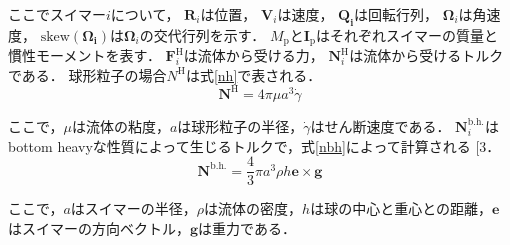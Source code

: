 \documentclass[twocolumns,10pt,a4j]{jarticle}
\makeatletter
\DeclareRobustCommand\cite{\unskip
  \@ifnextchar[{\@tempswatrue\@citex}{\@tempswafalse\@citex[]}}
\makeatother
\begin{document}
  \noindent
ここでスイマー$i$について，
$\boldsymbol{R}_i$は位置，
$\boldsymbol{V}_i$は速度，
$\boldsymbol{Q_i}$は回転行列，
$\boldsymbol{\Omega}_i$は角速度，
$\mathrm{skew} (\boldsymbol{\Omega_i})$は$\boldsymbol{\Omega}_i$の交代行列を示す．
$M_\mathrm{p}$と$\boldsymbol{I}_\mathrm{p}$はそれぞれスイマーの質量と慣性モーメントを表す．
$\boldsymbol{F}_i^\mathrm{H}$は流体から受ける力，
$\boldsymbol{N}_i^\mathrm{H}$は流体から受けるトルクである．
球形粒子の場合$N^\mathrm{H}$は式\eqref{nh}で表される．
  \vspace{-3truemm}
  \begin{equation}
    \boldsymbol{N^\mathrm{H}} = 4 \pi \mu a^3 \dot{\gamma}
    \label{nh}
  \end{equation}
  \vspace{-6truemm}

  \noindent
ここで，$\mu$は流体の粘度，$a$は球形粒子の半径，$\dot{\gamma}$はせん断速度である．
$\boldsymbol{N}_i^\mathrm{b.h.}$はbottom heavyな性質によって生じるトルクで，式\eqref{nbh}によって計算される\cite{3}．
  \vspace{-3truemm}
  \begin{equation}
    \boldsymbol{N}^\mathrm{b.h.} = \frac{4}{3} \pi a^3 \rho h \boldsymbol{e} \times \boldsymbol{g}
    \label{nbh}
  \end{equation}
  \vspace{-4truemm}

  \noindent
ここで，$a$はスイマーの半径，$\rho$は流体の密度，$h$は球の中心と重心との距離，$\boldsymbol{e}$はスイマーの方向ベクトル，$\boldsymbol{g}$は重力である．

\end{document}
